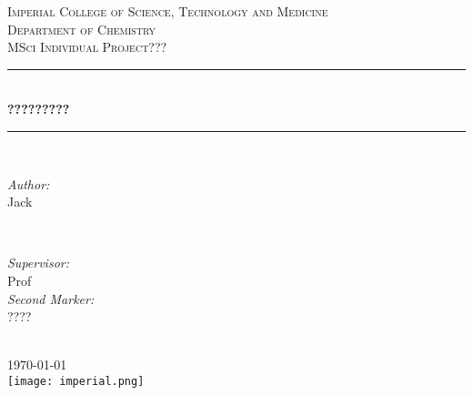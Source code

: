 \begin{titlepage}
	\newcommand{\HRule}{\rule{\linewidth}{0.5mm}} %
	\setlength{\topmargin}{0in}
	\center %
	
	
	
	\textsc{\LARGE Imperial College of Science, Technology and Medicine}\\[0.5cm] %
	\textsc{\Large Department of Chemistry}\\[1.5cm] %
	\textsc{\Large MSci Individual Project???}\\[0.5cm] %
	
	
	\HRule \\[0.4cm]
	{ \huge \bfseries ?????????}\\[0.2cm] %
	\HRule \\[1cm]
	
	
	\begin{minipage}{0.4\textwidth}
		\begin{flushleft} \large
			\emph{Author:}\\
			Jack \\[0.5cm]
		\end{flushleft}
	\end{minipage}
	~
	\begin{minipage}{0.5\textwidth}
		\begin{flushright} \large
			\emph{Supervisor:} \\
			Prof \\[0.5cm] %
			\emph{Second Marker:} \\
			????\\
		\end{flushright}
	\end{minipage}\\[2.5cm]
	
	
	
	{\large \today}\\[2.5cm] %
	
	
	\texttt{[image: imperial.png]}\\[1cm]
	\vfill %
\end{titlepage}
